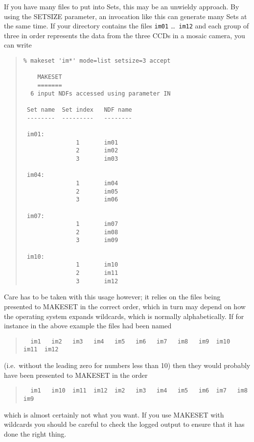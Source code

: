 \documentclass[twoside,11pt]{article}
\renewcommand{\_}{\texttt{\symbol{95}}}
\newenvironment{myquote}{\begin{quote}\begin{small}}{\end{small}\end{quote}}
\newcommand{\text}[1]{{\small \tt #1}}
\newcommand{\routine}[1]{{\sc #1}}
\begin{document}
If you have many files to put into Sets, this may be an unwieldy
approach.  By using the SETSIZE parameter, an invocation like this
can generate many Sets at the same time.  If your directory contains
the files \text{im01} \ldots\ \text{im12} and each group of three in
order represents the data from the three CCDs in a mosaic camera,
you can write
\begin{myquote}
\begin{verbatim}
% makeset 'im*' mode=list setsize=3 accept

    MAKESET
    =======
  6 input NDFs accessed using parameter IN

 Set name  Set index   NDF name
 --------  ---------   --------

 im01:
               1       im01
               2       im02
               3       im03

 im04:
               1       im04
               2       im05
               3       im06

 im07:
               1       im07
               2       im08
               3       im09

 im10:
               1       im10
               2       im11
               3       im12
\end{verbatim}
\end{myquote}
Care has to be taken with this usage however; it relies on the
files being presented to \routine{MAKESET} in the correct order,
which in turn may depend on how the operating system expands
wildcards, which is normally alphabetically.  
If for instance in the above example the files had been named
\begin{myquote}
\begin{verbatim}
  im1   im2   im3   im4   im5   im6   im7   im8   im9  im10  im11  im12
\end{verbatim}
\end{myquote}
(i.e.\ without the leading zero for numbers less than 10) 
then they would probably have been presented to \routine{MAKESET} 
in the order
\begin{myquote}
\begin{verbatim} 
  im1   im10  im11  im12  im2   im3   im4   im5   im6  im7   im8   im9 
\end{verbatim}
\end{myquote}
which is almost certainly not what you want.
If you use \routine{MAKESET} with wildcards you should be careful
to check the logged output to ensure that it has done the right thing.
\end{document}
